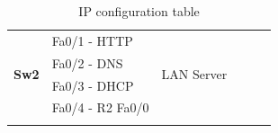 \documentclass[11pt,a4paper]{report}
\begin{document}
\begin{center}
\begin{longtable}{@{}llllll@{}}
\multirow{4}{*}{\textbf{Sw2}}                      & Fa0/1 - HTTP                                             & \multirow{4}{*}{LAN Server}                           & \multicolumn{1}{c}{}                             & \multicolumn{1}{c}{}                                      & \multicolumn{1}{c}{}                                  \\
                                                   & Fa0/2 - DNS                                              &                                                       & \multicolumn{1}{c}{}                             & \multicolumn{1}{c}{}                                      & \multicolumn{1}{c}{}                                  \\
                                                   & Fa0/3 - DHCP                                             &                                                       & \multicolumn{1}{c}{}                             & \multicolumn{1}{c}{}                                      & \multicolumn{1}{c}{}                                  \\
                                                   & Fa0/4 - R2 Fa0/0                                         &                                                       & \multicolumn{1}{c}{}                             & \multicolumn{1}{c}{}                                      & \multicolumn{1}{c}{}                                  \\* \bottomrule
\caption{IP configuration table}
\label{tab:deviceiptable}\\
\end{longtable}
        \end{center}
\end{document}

